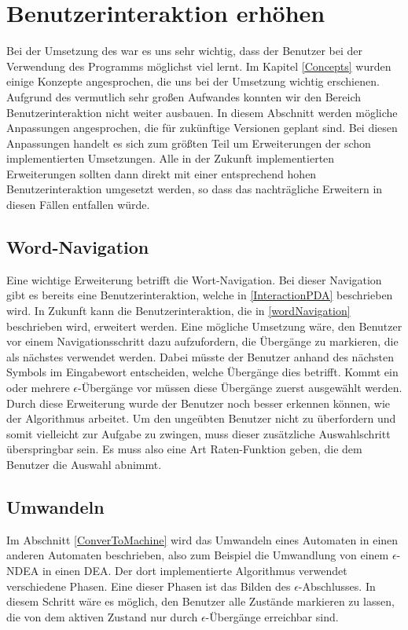 \section{Benutzerinteraktion erhöhen}

Bei der Umsetzung des \gtitools war es uns sehr wichtig, dass der Benutzer
bei der Verwendung des Programms möglichst viel lernt. Im Kapitel
\ref{Concepts} wurden einige Konzepte angesprochen, die uns bei der Umsetzung
wichtig erschienen. Aufgrund des vermutlich sehr großen Aufwandes konnten wir
den Bereich Benutzerinteraktion nicht weiter ausbauen. In diesem Abschnitt
werden mögliche Anpassungen angesprochen, die für zukünftige \gtitool Versionen
geplant sind. Bei diesen Anpassungen handelt es sich zum größten Teil um
Erweiterungen der schon implementierten Umsetzungen. Alle in der Zukunft
implementierten Erweiterungen sollten dann direkt mit einer entsprechend hohen
Benutzerinteraktion umgesetzt werden, so dass das nachträgliche Erweitern in
diesen Fällen entfallen würde.\vspace{10pt}


\subsection{Word-Navigation}
Eine wichtige Erweiterung betrifft die Wort-Navigation. Bei dieser Navigation
gibt es bereits eine Benutzerinteraktion, welche in \ref{InteractionPDA}
beschrieben wird. In Zukunft kann die Benutzerinteraktion, die in
\ref{wordNavigation} beschrieben wird, erweitert werden. Eine mögliche Umsetzung
wäre, den Benutzer vor einem Navigationsschritt dazu aufzufordern, die Übergänge
zu markieren, die als nächstes verwendet werden. Dabei müsste der Benutzer anhand
des nächsten Symbols im Eingabewort entscheiden, welche Übergänge dies betrifft.
Kommt ein oder mehrere $\epsilon$-Übergänge vor müssen diese Übergänge zuerst
ausgewählt werden. Durch diese Erweiterung wurde der Benutzer noch besser
erkennen können, wie der Algorithmus arbeitet. Um den ungeübten Benutzer nicht
zu überfordern und somit vielleicht zur Aufgabe zu zwingen, muss dieser zusätzliche
Auswahlschritt überspringbar sein. Es muss also eine Art Raten-Funktion geben,
die dem Benutzer die Auswahl abnimmt.\vspace{10pt}


\subsection{Umwandeln}
Im Abschnitt \ref{ConverToMachine} wird das Umwandeln eines Automaten in einen
anderen Automaten beschrieben, also zum Beispiel die Umwandlung von einem
$\epsilon$-NDEA in einen DEA. Der dort implementierte Algorithmus verwendet
verschiedene Phasen. Eine dieser Phasen ist das Bilden des
$\epsilon$-Abschlusses. In diesem Schritt wäre es möglich, den Benutzer alle
Zustände markieren zu lassen, die von dem aktiven Zustand nur durch
$\epsilon$-Übergänge erreichbar sind.\vspace{10pt}

